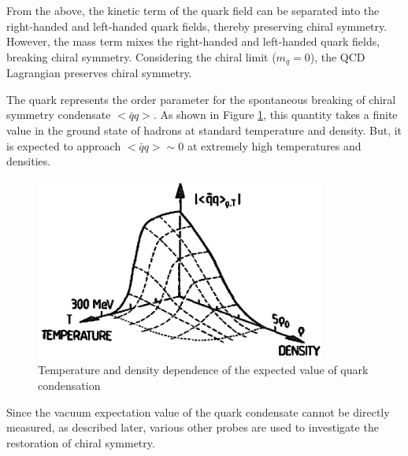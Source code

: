         From the above, the kinetic term of the quark field can be separated into the right-handed and left-handed quark fields, thereby preserving chiral symmetry. However, the mass term mixes the right-handed and left-handed quark fields, breaking chiral symmetry. Considering the chiral limit ($m_q = 0$), the QCD Lagrangian preserves chiral symmetry.  
        
        The quark represents the order parameter for the spontaneous breaking of chiral symmetry condensate $< \bar{q}q >$. As shown in Figure \ref{quark_condensate}\cite{Weise:1993ax}, this quantity takes a finite value in the ground state of hadrons at standard temperature and density. But, it is expected to approach $< \bar{q}q > \sim 0$ at extremely high temperatures and densities. 
        \begin{figure}[htbp]  
            \centering  
            \includegraphics[keepaspectratio, scale=0.6]{fig/1_1_quark_condensate.png}  
            \caption{Temperature and density dependence of the expected value of quark condensation}  
            \label{quark_condensate}  
        \end{figure}  
        
        Since the vacuum expectation value of the quark condensate cannot be directly measured, as described later, various other probes are used to investigate the restoration of chiral symmetry.
